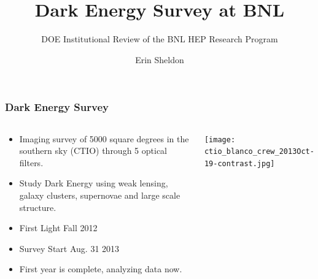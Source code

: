 \documentclass{beamer}
\title{Dark Energy Survey at BNL}
\author{Erin Sheldon}
\institute{Brookhaven National Laboratory}
\subtitle{DOE Institutional Review of the BNL HEP Research Program}
\begin{document}
\frame{\titlepage}


\frame
{
    \frametitle{Dark Energy Survey}

    \fontsize{9}{0.8\baselineskip}
    \begin{columns}
        \begin{column}{0.5\textwidth}    
            \begin{itemize}
                \item Imaging survey of 5000 square degrees in the 
                    southern sky (CTIO) through 5 optical filters.
                \item Study Dark Energy using weak lensing, galaxy clusters, supernovae
                    and large scale structure.
                \item First Light Fall 2012
                \item Survey Start Aug. 31 2013
                \item First year is complete, analyzing data now.
            \end{itemize}
        \end{column}
        \begin{column}{0.5\textwidth}
            \texttt{[image: ctio\_blanco\_crew\_2013Oct-19-contrast.jpg]}
        \end{column}
    \end{columns}
}
\end{document}
